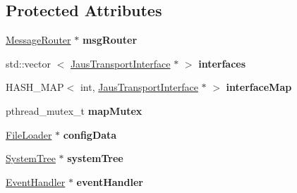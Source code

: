\subsection*{\-Protected \-Attributes}
\begin{DoxyCompactItemize}
\item 
\hypertarget{class_jaus_communication_manager_a32b549c9ea61dad55085326fe708a49f}{\hyperlink{class_message_router}{\-Message\-Router} $\ast$ {\bfseries msg\-Router}}\label{class_jaus_communication_manager_a32b549c9ea61dad55085326fe708a49f}

\item 
\hypertarget{class_jaus_communication_manager_acdfd1fae03e46cfff96053eee54e3cfd}{std\-::vector\*
$<$ \hyperlink{class_jaus_transport_interface}{\-Jaus\-Transport\-Interface} $\ast$ $>$ {\bfseries interfaces}}\label{class_jaus_communication_manager_acdfd1fae03e46cfff96053eee54e3cfd}

\item 
\hypertarget{class_jaus_communication_manager_a4f3cd43a306469abc5d29edea954a28e}{\-H\-A\-S\-H\-\_\-\-M\-A\-P$<$ int, \*
\hyperlink{class_jaus_transport_interface}{\-Jaus\-Transport\-Interface} $\ast$ $>$ {\bfseries interface\-Map}}\label{class_jaus_communication_manager_a4f3cd43a306469abc5d29edea954a28e}

\item 
\hypertarget{class_jaus_communication_manager_af1071dec74ffcc17444b1f4b3db84828}{pthread\-\_\-mutex\-\_\-t {\bfseries map\-Mutex}}\label{class_jaus_communication_manager_af1071dec74ffcc17444b1f4b3db84828}

\item 
\hypertarget{class_jaus_communication_manager_afeaec4ef3e4b2a389ba9703e9ce099d5}{\hyperlink{class_file_loader}{\-File\-Loader} $\ast$ {\bfseries config\-Data}}\label{class_jaus_communication_manager_afeaec4ef3e4b2a389ba9703e9ce099d5}

\item 
\hypertarget{class_jaus_communication_manager_a1376d20d0a6494d0617b21b340e14e98}{\hyperlink{class_system_tree}{\-System\-Tree} $\ast$ {\bfseries system\-Tree}}\label{class_jaus_communication_manager_a1376d20d0a6494d0617b21b340e14e98}

\item 
\hypertarget{class_jaus_communication_manager_ac9fe5c9ebd44d6b6976a97e50f108ed9}{\hyperlink{class_event_handler}{\-Event\-Handler} $\ast$ {\bfseries event\-Handler}}\label{class_jaus_communication_manager_ac9fe5c9ebd44d6b6976a97e50f108ed9}


\end{DoxyCompactItemize}
